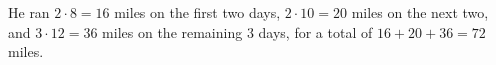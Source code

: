 He ran $2\cdot8=16$ miles on the first two days, $2\cdot10=20$ miles on the next two, and $3\cdot12=36$ miles on the remaining $3$ days, for a total of $16+20+36=\boxed{72}$ miles.
